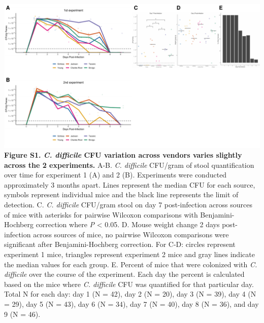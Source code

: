 \documentclass[11pt,]{article}
\begin{document}
\includegraphics{figure_S1.pdf} \textbf{Figure S1. \emph{C. difficile}
CFU variation across vendors varies slightly across the 2 experiments.}
A-B. \emph{C. difficile} CFU/gram of stool quantification over time for
experiment 1 (A) and 2 (B). Experiments were conducted approximately 3
months apart. Lines represent the median CFU for each source, symbols
represent individual mice and the black line represents the limit of
detection. C. \emph{C. difficile} CFU/gram stool on day 7 post-infection
across sources of mice with asterisks for pairwise Wilcoxon comparisons
with Benjamini-Hochberg correction where \emph{P} \textless{} 0.05. D.
Mouse weight change 2 days post-infection across sources of mice, no
pairwise Wilcoxon comparisons were significant after Benjamini-Hochberg
correction. For C-D: circles represent experiment 1 mice, triangles
represent experiment 2 mice and gray lines indicate the median values
for each group. E. Percent of mice that were colonized with \emph{C.
difficile} over the course of the experiment. Each day the percent is
calculated based on the mice where \emph{C. difficile} CFU was
quantified for that particular day. Total N for each day: day 1 (N =
42), day 2 (N = 20), day 3 (N = 39), day 4 (N = 29), day 5 (N = 43), day
6 (N = 34), day 7 (N = 40), day 8 (N = 36), and day 9 (N = 46).

\newpage
\end{document}
